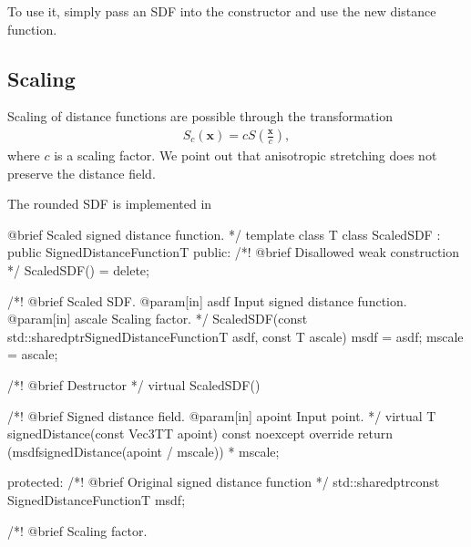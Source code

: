 \documentclass[letterpaper,10pt,english]{sphinxmanual}
\begin{document}
\sphinxAtStartPar
To use it, simply pass an SDF into the constructor and use the new distance function.


\subsection{Scaling}
\label{\detokenize{ImplemSDF:scaling}}
\sphinxAtStartPar
Scaling of distance functions are possible through the transformation
\begin{equation*}
\begin{split}S_c\left(\mathbf{x}\right) = c S\left(\frac{\mathbf{x}}{c}\right),\end{split}
\end{equation*}
\sphinxAtStartPar
where \(c\) is a scaling factor.
We point out that anisotropic stretching does not preserve the distance field.

\sphinxAtStartPar
The rounded SDF is implemented in 

\begin{sphinxVerbatim}[commandchars=\\\{\}]
  @brief Scaled signed distance function.
*/
template \PYGZlt{}class T\PYGZgt{}
class ScaledSDF : public SignedDistanceFunction\PYGZlt{}T\PYGZgt{}
\PYGZob{}
public:
  /*!
    @brief Disallowed weak construction
  */
  ScaledSDF() = delete;

  /*!
    @brief Scaled SDF.
    @param[in] a\PYGZus{}sdf   Input signed distance function.
    @param[in] a\PYGZus{}scale Scaling factor.
  */
  ScaledSDF(const std::shared\PYGZus{}ptr\PYGZlt{}SignedDistanceFunction\PYGZlt{}T\PYGZgt{}\PYGZgt{} a\PYGZus{}sdf, const T a\PYGZus{}scale)
  \PYGZob{}
    m\PYGZus{}sdf   = a\PYGZus{}sdf;
    m\PYGZus{}scale = a\PYGZus{}scale;
  \PYGZcb{}

  /*!
    @brief Destructor
  */
  virtual \PYGZti{}ScaledSDF()
  \PYGZob{}\PYGZcb{}

  /*!
    @brief Signed distance field.
    @param[in] a\PYGZus{}point Input point.
  */
  virtual T
  signedDistance(const Vec3T\PYGZlt{}T\PYGZgt{}\PYGZam{} a\PYGZus{}point) const noexcept override
  \PYGZob{}
    return (m\PYGZus{}sdf\PYGZhy{}\PYGZgt{}signedDistance(a\PYGZus{}point / m\PYGZus{}scale)) * m\PYGZus{}scale;
  \PYGZcb{}

protected:
  /*!
    @brief Original signed distance function
  */
  std::shared\PYGZus{}ptr\PYGZlt{}const SignedDistanceFunction\PYGZlt{}T\PYGZgt{}\PYGZgt{} m\PYGZus{}sdf;

  /*!
    @brief Scaling factor.
\end{sphinxVerbatim}
\end{document}

